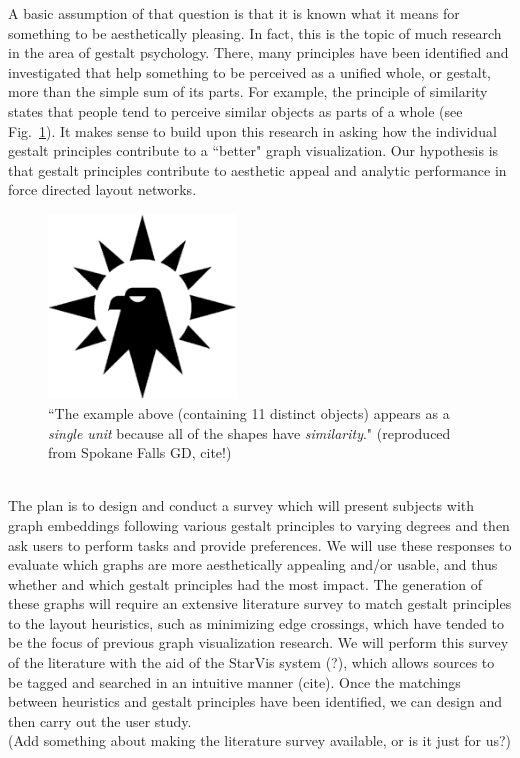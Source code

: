 \documentclass[12pt, twocolumn]{article}
\begin{document}
A basic assumption of that question is that it is known what it means for something to be aesthetically pleasing. 
In fact, this is the topic of much research in the area of gestalt psychology. 
There, many principles have been identified and investigated that help something to be perceived as a unified whole, or gestalt, more than the simple sum of its parts. 
For example, the principle of similarity states that people tend to perceive similar objects as parts of a whole (see Fig.~\ref{fig:sim}). 
It makes sense to build upon this research in asking how the individual gestalt principles contribute to a ``better" graph visualization.
Our hypothesis is that gestalt principles contribute to aesthetic appeal and analytic performance in force directed layout networks.
\begin{figure}[h!]
	\caption{\small``The example above (containing 11 distinct objects) appears as a \emph{single unit} because all of the shapes have \emph{similarity}." (reproduced from Spokane Falls GD, cite!)}
	\label{fig:sim}
	\includegraphics[width=5cm]{similarity01.png}
\end{figure}
\\

The plan is to design and conduct a survey which will present subjects with graph embeddings following various gestalt principles to varying degrees and then ask users to perform tasks and provide preferences.
We will use these responses to evaluate which graphs are more aesthetically appealing and/or usable, and thus whether and which gestalt principles had the most impact. 
The generation of these graphs will require an extensive literature survey to match gestalt principles to the layout heuristics, such as minimizing edge crossings, which have tended to be the focus of previous graph visualization research. 
We will perform this survey of the literature with the aid of the StarVis system (?), which allows sources to be tagged and searched in an intuitive manner (cite).
Once the matchings between heuristics and gestalt principles have been identified, we can design and then carry out the user study.
\\
(Add something about making the literature survey available, or is it just for us?)
\\
\end{document}
